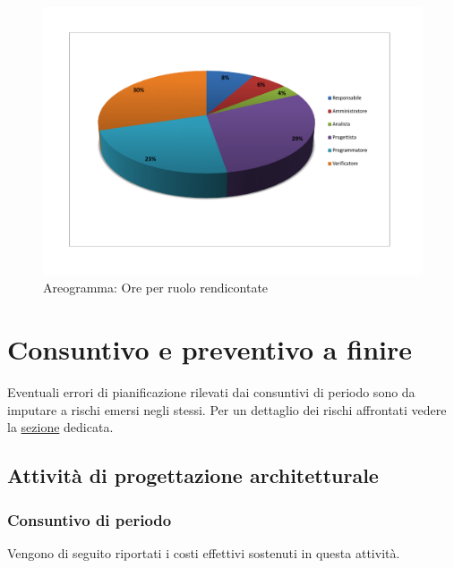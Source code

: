 \documentclass[a4paper, titlepage]{article}
\begin{document}
	\begin{figure}[!ht]
		\centering
		\includegraphics[scale=0.5]{Img/Grafici/Aer07.pdf}
		\caption{ Areogramma: Ore per ruolo rendicontate}
	\end{figure}
	
	\newpage
	\section{Consuntivo e preventivo a finire}
	Eventuali errori di pianificazione rilevati dai consuntivi di periodo sono da imputare a rischi emersi negli stessi. Per un dettaglio dei rischi affrontati vedere la \hyperref[Attualizzazione dei rischi]{sezione} dedicata.
	\subsection{Attività di progettazione architetturale}
	
	\subsubsection {Consuntivo di periodo}
	Vengono di seguito riportati i costi effettivi sostenuti in questa attività.
	
\end{document}
